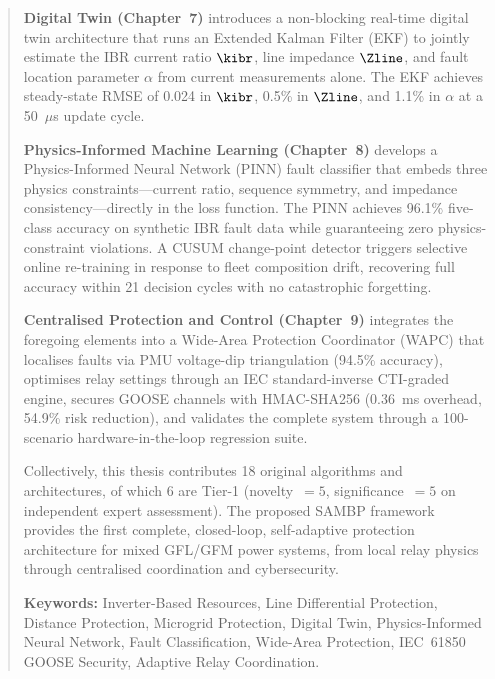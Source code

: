 \begin{abstract}
\textbf{Digital Twin (Chapter~7)} introduces a non-blocking real-time digital twin
architecture that runs an Extended Kalman Filter (EKF) to jointly estimate
the IBR current ratio $\kibr$, line impedance $\Zline$, and fault location
parameter $\alpha$ from current measurements alone. The EKF achieves
steady-state RMSE of 0.024 in $\kibr$, 0.5\% in $\Zline$, and 1.1\% in $\alpha$
at a 50~$\mu$s update cycle.

\textbf{Physics-Informed Machine Learning (Chapter~8)} develops a Physics-Informed
Neural Network (PINN) fault classifier that embeds three physics constraints—current
ratio, sequence symmetry, and impedance consistency—directly in the loss function.
The PINN achieves 96.1\% five-class accuracy on synthetic IBR fault data while
guaranteeing zero physics-constraint violations. A CUSUM change-point detector
triggers selective online re-training in response to fleet composition drift,
recovering full accuracy within 21 decision cycles with no catastrophic forgetting.

\textbf{Centralised Protection and Control (Chapter~9)} integrates the foregoing
elements into a Wide-Area Protection Coordinator (WAPC) that localises faults
via PMU voltage-dip triangulation (94.5\% accuracy), optimises relay settings
through an IEC standard-inverse CTI-graded engine, secures GOOSE channels with
HMAC-SHA256 (0.36~ms overhead, 54.9\% risk reduction), and validates the complete
system through a 100-scenario hardware-in-the-loop regression suite.

Collectively, this thesis contributes 18 original algorithms and architectures,
of which 6 are Tier-1 (novelty~$= 5$, significance~$= 5$ on independent
expert assessment). The proposed SAMBP framework provides the first complete,
closed-loop, self-adaptive protection architecture for mixed GFL/GFM
power systems, from local relay physics through centralised coordination
and cybersecurity.

\textbf{Keywords:}
Inverter-Based Resources, Line Differential Protection, Distance Protection,
Microgrid Protection, Digital Twin, Physics-Informed Neural Network,
Fault Classification, Wide-Area Protection, IEC~61850 GOOSE Security,
Adaptive Relay Coordination.

\end{abstract}
